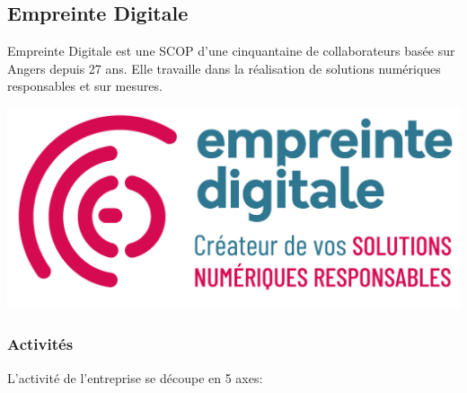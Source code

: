\documentclass[12pt]{article}
\begin{document}
\subsection{Empreinte Digitale}
\noindent%
\begin{minipage}{.7\textwidth}%
Empreinte Digitale est une \gls{SCOP} d'une cinquantaine de collaborateurs basée sur Angers depuis 27 ans. 
Elle travaille dans la réalisation de solutions numériques responsables et sur mesures.
\end{minipage}%
\hfill
\begin{minipage}{.3\textwidth}%
\begin{center}
    \includegraphics[scale=0.3]{src/logo_ed.png}
\end{center}
\end{minipage}%

\subsubsection{Activités}
L'activité de l'entreprise se découpe en 5 axes:
\end{document}
